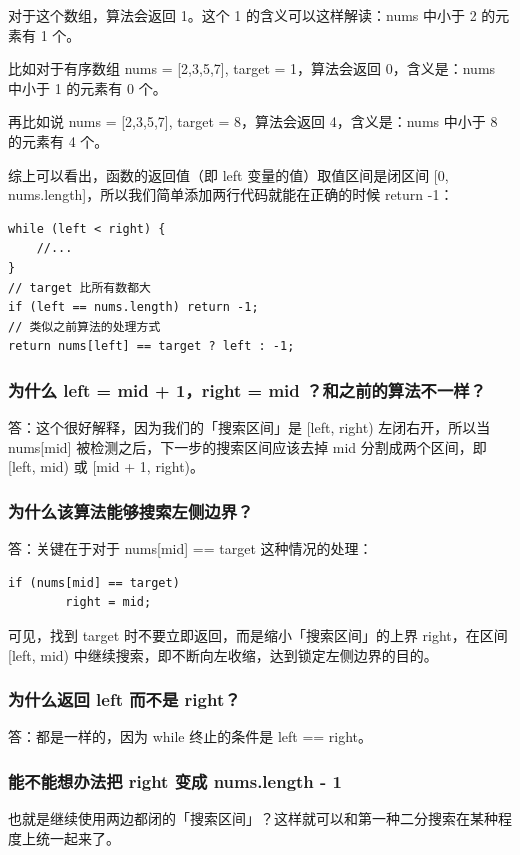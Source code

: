 \documentclass[12pt]{article}
\begin{document}
对于这个数组，算法会返回 1。这个 1 的含义可以这样解读：nums 中小于 2 的元素有 1 个。

比如对于有序数组 nums = [2,3,5,7], target = 1，算法会返回 0，含义是：nums 中小于 1 的元素有 0 个。

再比如说 nums = [2,3,5,7], target = 8，算法会返回 4，含义是：nums 中小于 8 的元素有 4 个。

综上可以看出，函数的返回值（即 left 变量的值）取值区间是闭区间 [0, nums.length]，所以我们简单添加两行代码就能在正确的时候 return -1：
\begin{lstlisting}
while (left < right) {
    //...
}
// target 比所有数都大
if (left == nums.length) return -1;
// 类似之前算法的处理方式
return nums[left] == target ? left : -1;
\end{lstlisting}

\subsubsection{为什么 left = mid + 1，right = mid ？和之前的算法不一样？}
答：这个很好解释，因为我们的「搜索区间」是 [left, right) 左闭右开，所以当 nums[mid] 被检测之后，下一步的搜索区间应该去掉 mid 分割成两个区间，即 [left, mid) 或 [mid + 1, right)。

\subsubsection{为什么该算法能够搜索左侧边界？}
答：关键在于对于 nums[mid] == target 这种情况的处理：
\begin{lstlisting}
if (nums[mid] == target)
        right = mid;
\end{lstlisting}

可见，找到 target 时不要立即返回，而是缩小「搜索区间」的上界 right，在区间 [left, mid) 中继续搜索，即不断向左收缩，达到锁定左侧边界的目的。

\subsubsection{为什么返回 left 而不是 right？}
答：都是一样的，因为 while 终止的条件是 left == right。

\subsubsection{能不能想办法把 right 变成 nums.length - 1}
也就是继续使用两边都闭的「搜索区间」？这样就可以和第一种二分搜索在某种程度上统一起来了。
\end{document}
